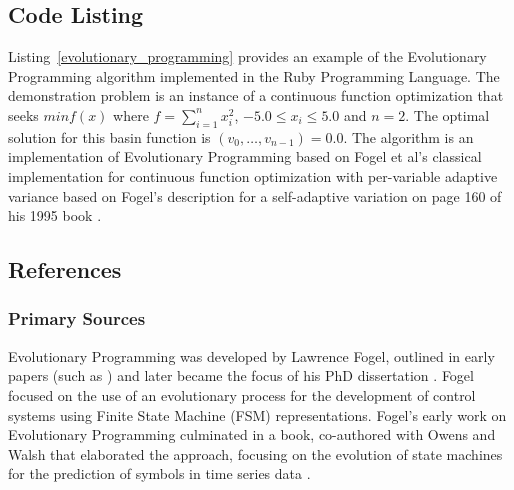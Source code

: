 \subsection{Code Listing}
Listing~\ref{evolutionary_programming} provides an example of the Evolutionary Programming algorithm implemented in the Ruby Programming Language.
The demonstration problem is an instance of a continuous function optimization that seeks $min f(x)$ where $f=\sum_{i=1}^n x_{i}^2$, $-5.0\leq x_i \leq 5.0$ and $n=2$. The optimal solution for this basin function is $(v_0,\ldots,v_{n-1})=0.0$.
The algorithm is an implementation of Evolutionary Programming based on Fogel et al's classical implementation for continuous function optimization \cite{Fogel1991a} with per-variable adaptive variance based on Fogel's description for a self-adaptive variation on page 160 of his 1995 book \cite{Fogel1995}.




\subsection{References}


% 
% 
\subsubsection{Primary Sources}
Evolutionary Programming was developed by Lawrence Fogel, outlined in early papers (such as \cite{Fogel1962}) and later became the focus of his PhD dissertation \cite{Fogel1964}. Fogel focused on the use of an evolutionary process for the development of control systems using Finite State Machine (FSM) representations. 
Fogel's early work on Evolutionary Programming culminated in a book, co-authored with Owens and Walsh that elaborated the approach, focusing on the evolution of state machines for the prediction of symbols in time series data \cite{Fogel1966}.

